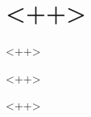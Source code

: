 \documentclass[a4paper,twocolumn,10pt]{report}
\begin{document}
\section*{<++>}

%
<++>

\vspace{5mm} %

%

<++>

\parskip=1.5mm %

%
%
%
%
%
%

<++>


\begin{thebibliography}{99}
\bibitem{<++>} 
\end{thebibliography}
\end{document}
